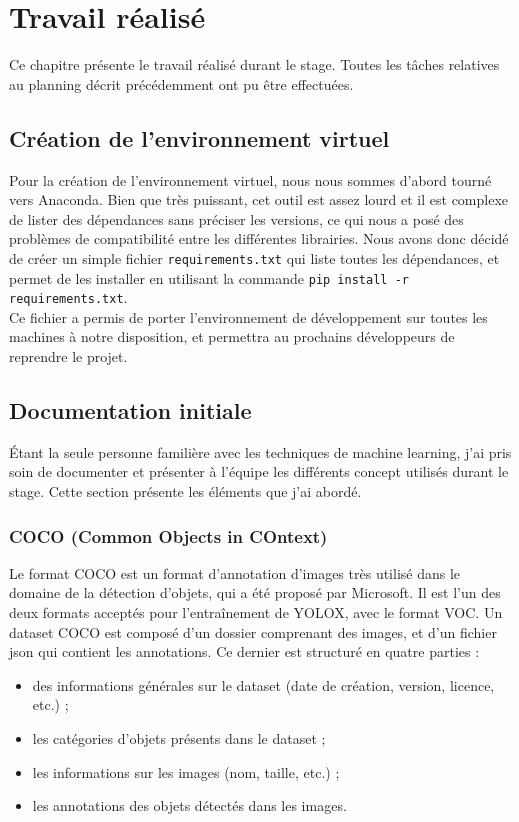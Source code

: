 \chapter{Travail réalisé}

Ce chapitre présente le travail réalisé durant le stage. Toutes les tâches relatives au planning
décrit précédemment ont pu être effectuées.

\section{Création de l'environnement virtuel}

Pour la création de l'environnement virtuel, nous nous sommes d'abord tourné vers Anaconda.
Bien que très puissant, cet outil est assez lourd et il est complexe de lister des dépendances
sans préciser les versions, ce qui nous a posé des problèmes de compatibilité entre les différentes
librairies.
Nous avons donc décidé de créer un simple fichier \texttt{requirements.txt} qui liste
toutes les dépendances, et permet de les installer en utilisant la commande
\texttt{pip install -r requirements.txt}.\\

Ce fichier a permis de porter l'environnement de développement sur toutes les machines
à notre disposition, et permettra au prochains développeurs de reprendre le projet.

\section{Documentation initiale}

Étant la seule personne familière avec les techniques de machine learning, j'ai pris soin de documenter
et présenter à l'équipe les différents concept utilisés durant le stage. Cette section présente
les éléments que j'ai abordé.

\subsection{COCO (Common Objects in COntext)}

Le format COCO \cite{Lin_Maire_Belongie_Bourdev_Girshick_Hays_Perona_Ramanan_Zitnick_Dollar_2015}
est un format d'annotation d'images très utilisé dans le domaine de la détection d'objets,
qui a été proposé par Microsoft.
Il est l'un des deux formats acceptés pour l'entraînement de YOLOX, avec le format VOC.
Un dataset COCO est composé d'un dossier comprenant des images, et d'un fichier json qui contient les annotations.
Ce dernier est structuré en quatre parties :
\begin{itemize}
    \item des informations générales sur le dataset (date de création, version, licence, etc.) ;
    \item les catégories d'objets présents dans le dataset ;
    \item les informations sur les images (nom, taille, etc.) ;
    \item les annotations des objets détectés dans les images.
\end{itemize}

